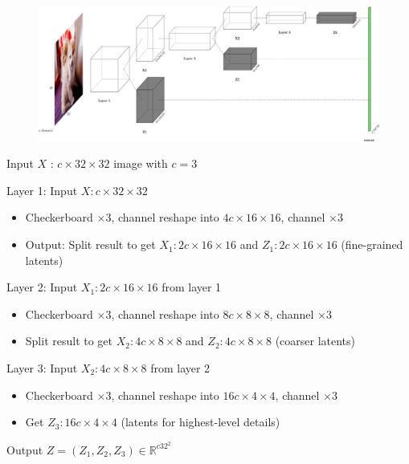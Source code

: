 \documentclass{report}
\begin{document}
\begin{definition}
    \begin{figure}[H]
        \centering
        \includegraphics[width=1.0\textwidth]{.././assets/10.16.png}
    \end{figure}

    Input $X$ : $c \times 32 \times 32$ image with $c=3$

    Layer 1: Input $X: c \times 32 \times 32$

    \begin{itemize}
        \item Checkerboard $\times 3$, channel reshape into $4 c \times 16 \times 16$, channel $\times 3$
        \item Output: Split result to get $X_{1}: 2 c \times 16 \times 16$ and $Z_{1}: 2 c \times 16 \times 16$ (fine-grained latents)
    \end{itemize}

    Layer 2: Input $X_{1}: 2 c \times 16 \times 16$ from layer 1

    \begin{itemize}
        \item Checkerboard $\times 3$, channel reshape into $8 c \times 8 \times 8$, channel $\times 3$
        \item Split result to get $X_{2}: 4 c \times 8 \times 8$ and $Z_{2}: 4 c \times 8 \times 8$ (coarser latents)
    \end{itemize}

    Layer 3: Input $X_{2}: 4 c \times 8 \times 8$ from layer 2

    \begin{itemize}
        \item Checkerboard $\times 3$, channel reshape into $16 c \times 4 \times 4$, channel $\times 3$
        \item Get $Z_{3}: 16 c \times 4 \times 4$ (latents for highest-level details)
    \end{itemize}

    Output $Z = (Z_1, Z_2, Z_3) \in \mathbb{R}^{c \dot 32^2}$
\end{definition}
\end{document}
